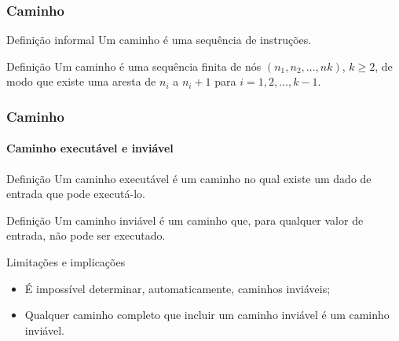 \begin{frame}[parent={cmap:structural-software-testing},hasnext=true,hasprev=true]
\frametitle{Caminho}
\label{concept:path}

\begin{block:concept}{Definição informal}
Um caminho é uma sequência de instruções.
\end{block:concept}

\begin{block:concept}{Definição}
Um caminho é uma sequência finita de nós $(n_1, n_2, . . . , nk)$,
$k \geqslant 2$, de modo que existe uma aresta de $n_i$ a $n_i + 1$ para
$i = 1, 2, ... , k - 1$.
\end{block:concept}
\end{frame}


\begin{frame}
\frametitle{Caminho}
\framesubtitle{Caminho executável e inviável}
\label{concept:infeasible-path}
\label{concept:missing-path}

\begin{block:concept}{Definição}
Um caminho executável é um caminho no qual existe um dado de entrada que pode executá-lo.
\end{block:concept}

\begin{block:concept}{Definição}
Um caminho inviável é um caminho que, para qualquer valor de entrada, não pode ser executado.
\end{block:concept}

\begin{block:fact}{Limitações e implicações}
\begin{itemize}
	\item É impossível determinar, automaticamente, caminhos inviáveis;

	\item Qualquer caminho completo que incluir um caminho inviável é um caminho inviável.
\end{itemize}
\end{block:fact}

\hfill
{}
\end{frame}



